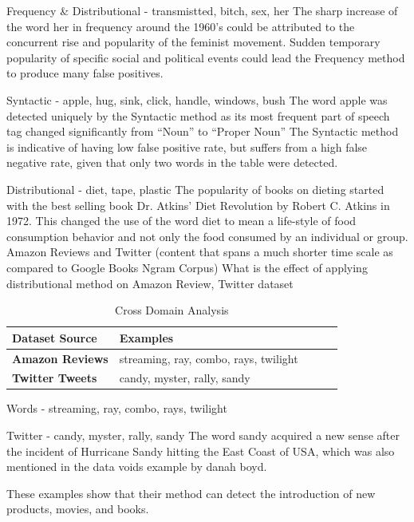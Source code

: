 Frequency \& Distributional - transmistted, bitch, sex, her
The sharp increase of the word her in frequency around the 1960’s could be attributed to the concurrent rise and popularity of the feminist movement.
Sudden temporary popularity of specific social and political events could lead the Frequency method to produce many false positives.

Syntactic - apple, hug, sink, click, handle, windows, bush
The word apple was detected uniquely by the Syntactic method as its most frequent part of speech tag changed significantly from “Noun” to “Proper Noun”
The Syntactic method is indicative of having low false positive rate, but suffers from a high false negative rate, given that only two words in the table were detected.

Distributional - diet, tape, plastic
The popularity of books on dieting started with the best selling book Dr. Atkins’ Diet Revolution by Robert C. Atkins in 1972.
This changed the use of the word diet to mean a life-style of food consumption behavior and not only the food consumed by an individual or group.
\\

Amazon Reviews and Twitter (content that spans a much shorter time scale as compared to Google Books Ngram Corpus)
What is the effect of applying distributional method on Amazon Review, Twitter dataset


\begin{table}[]
\begin{tabular}{@{}lllll@{}}
\toprule
\textbf{Dataset Source} & \textbf{Examples}                     &  &  &  \\ \midrule
\textbf{Amazon Reviews} & streaming, ray, combo, rays, twilight &  &  &  \\
\textbf{Twitter Tweets} & candy, myster, rally, sandy           &  &  &  \\ \bottomrule
\end{tabular}
\caption{Cross Domain Analysis}
\label{tab:sources-examples}
\end{table}

Words - streaming, ray, combo, rays, twilight

Twitter - candy, myster, rally, sandy
The word sandy acquired a new sense after the incident of Hurricane Sandy hitting the East Coast of USA, which was also mentioned in the data voids example by danah boyd.

These examples show that their method can detect the introduction of new products, movies, and books.

